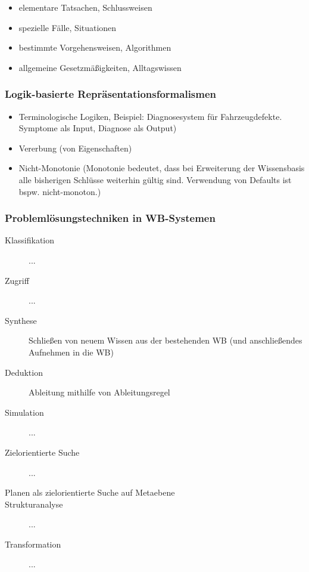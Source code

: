 \documentclass[runningheads]{llncs}
\begin{document}
\begin{itemize}
    \item elementare Tatsachen, Schlussweisen
    \item spezielle Fälle, Situationen
    \item bestimmte Vorgehensweisen, Algorithmen
    \item allgemeine Gesetzmäßigkeiten, Alltagswissen
\end{itemize}

\subsubsection{Logik-basierte Repräsentationsformalismen}
\begin{itemize}
    \item Terminologische Logiken, Beispiel: Diagnosesystem für Fahrzeugdefekte. Symptome als Input, Diagnose als Output)
    \item Vererbung (von Eigenschaften)
    \item Nicht-Monotonie (Monotonie bedeutet, dass bei Erweiterung der Wissensbasis alle bisherigen Schlüsse weiterhin gültig sind. Verwendung von Defaults ist bspw. nicht-monoton.)
\end{itemize}

\subsubsection{Problemlösungstechniken in WB-Systemen}

\begin{description}
    \item[Klassifikation] ...
    \item[Zugriff] ...
    \item[Synthese] Schließen von neuem Wissen aus der bestehenden WB (und anschließendes Aufnehmen in die WB)
    \item[Deduktion] Ableitung mithilfe von Ableitungsregel
    \item[Simulation] ...
    \item[Zielorientierte Suche] ...
    \item[Planen als zielorientierte Suche auf Metaebene] 
    \item[Strukturanalyse] ...
    \item[Transformation] ...
\end{description}
\end{document}
